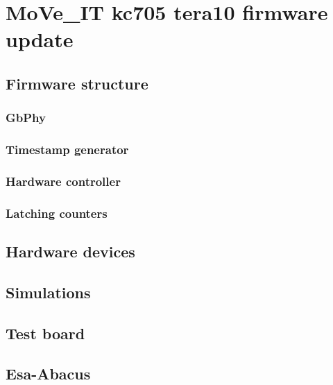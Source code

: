 \chapter{MoVe\_IT kc705 tera10 firmware update}

\section{Firmware structure}

\subsection{GbPhy}

\subsection{Timestamp generator}

\subsection{Hardware controller}

\subsection{Latching counters}

\section{Hardware devices}

\section{Simulations}

\section{Test board}

\section{Esa-Abacus}
